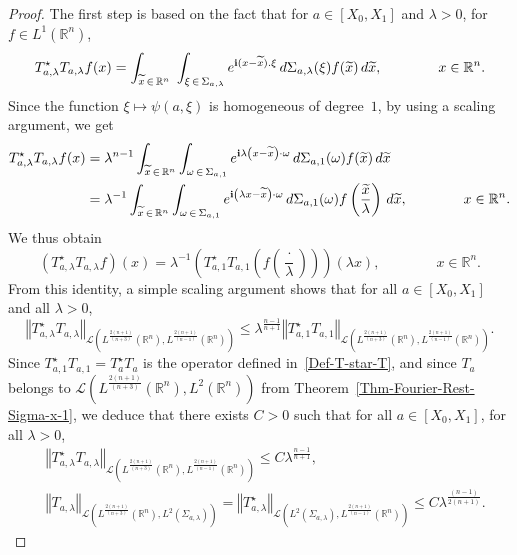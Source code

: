 \documentclass[10pt]{amsart}
\theoremstyle{definition}\newtheorem{defi}[theo]{Definition}\newtheorem{rema}[theo]{Remark}\newtheorem{exam}[theo]{Example}\newtheorem{exem}[theo]{Example}\newtheorem{nota}[theo]{Notation}
\newcommand{\scL}{\mathscr{L}}
\newcommand*\R{\mathbb{R}}
\renewcommand{\i}{\mathbf{i}}
\newcommand{\norm}[1]{\left\Vert#1\right\Vert}
\renewcommand{\leq}{\leqslant}
\renewcommand{\tilde}{\widetilde}
\let\oldtilde\tilde
\renewcommand*{\tilde}[1]{\mathchoice{\widetilde{#1}}{\widetilde{#1}}{\oldtilde{#1}}{\oldtilde{#1}}}
\begin{document}
\begin{proof}
The first step is based on the fact that for $a \in [X_0, X_1]$ and $\lambda >0$, for $f \in L^1(\R^n)$,
\begin{equation*}
T_{a,\lambda}^\star T_{a, \lambda} f(x) =
\int_{\tilde x\, \in\,\R^{n}}\;
\int_{\xi\,\in\,\Sigma_{a,\lambda}} e^{\i (x-\tilde x). \xi } \, d \Sigma_{a,\lambda }(\xi) f(\tilde x) \, d \tilde x,
\qquad \qquad x \in \R^n.
\end{equation*}
Since the function $\xi \mapsto \psi(a, \xi)$ is homogeneous of degree~$1$, by using a scaling argument, we get
\begin{align*}
T_{a,\lambda}^\star T_{a, \lambda} f(x) & =
\lambda^{n-1} \int_{\tilde x\, \in\,\R^{n}} \int_{\omega\,\in\,\Sigma_{a,1}} e^{\i \lambda \left(x- \tilde x\right) \cdot \omega} \, d \Sigma_{a,1}(\omega) f(\tilde x) \, d \tilde x
\\
& =
\lambda^{-1} \int_{\tilde x\,\in\,\R^{n}} \int_{\omega \,\in\,\Sigma_{a,1}} e^{\i \left(\lambda x- \tilde x\right) \cdot \omega} \, d \Sigma_{a,1}(\omega) f\left(\frac{\tilde x}\lambda\right) \, d \tilde x, \qquad \qquad x \in \R^n.
\end{align*}
We thus obtain
\begin{equation*}
\left(T_{a,\lambda}^\star T_{a, \lambda}f \right)\left(x\right) =
\lambda^{-1} \left(T_{a,1}^\star T_{a, 1} \left(f\left(\frac{\cdot}{\lambda}\right)\right)\right)(\lambda x),
\qquad \qquad x \in \R^n.
\end{equation*}
From this identity, a simple scaling argument shows that for all $a \in [X_0, X_1] $ and all $\lambda>0 $,
\begin{equation*}
\norm{T_{a,\lambda}^\star T_{a, \lambda} }_{\scL\left(L^{\frac{2(n+1)}{(n+3)}}(\R^n),L^{\frac{2(n+1)}{(n-1)}}(\R^n)\right)}
\leq
\lambda^{\frac{n-1}{n+1}} \norm{T_{a,1}^\star T_{a, 1} }_{\scL\left(L^{\frac{2(n+1)}{(n+3)}}(\R^n),L^{\frac{2(n+1)}{(n-1)}}(\R^n)\right)}.
\end{equation*}
Since $T_{a,1}^\star T_{a, 1} =T_{a}^\star T_{a} $ is the operator defined in~\eqref{Def-T-star-T}, and since $T_a$ belongs to $\scL(L^{\frac{2(n+1)}{(n+3)}}(\R^n),L^{2}(\R^n))$ from Theorem~\ref{Thm-Fourier-Rest-Sigma-x-1}, we deduce that there exists $C>0$ such that for all $a \in [X_0, X_1]$, for all $\lambda >0$,
\begin{align*}
& \norm{T_{a,\lambda}^\star T_{a, \lambda} }_{\scL\left(L^{\frac{2(n+1)}{(n+3)}}(\R^n),L^{\frac{2(n+1)}{(n-1)}}(\R^n)\right)}
\leq C \lambda^{\frac{n-1}{n+1}},
\\
& \norm{T_{a, \lambda} }_{\scL\left(L^{\frac{2(n+1)}{(n+3)}}(\R^n), L^2(\Sigma_{a,\lambda})\right)} = \norm{T_{a,\lambda}^\star}_{\scL\left(L^{2}(\Sigma_{a,\lambda}),L^{\frac{2(n+1)}{(n-1)}}(\R^n)\right)}
\leq C \lambda^{\frac{(n-1)}{2(n+1)}}.
\end{align*}


\end{proof}
\end{document}
